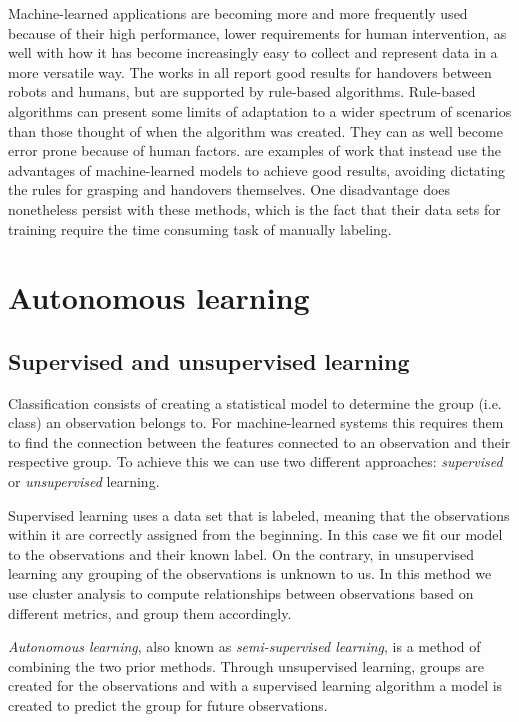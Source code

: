 Machine-learned applications are becoming more and more frequently used because of their high performance, lower requirements for human intervention, as well with how it has become increasingly easy to collect and represent data in a more versatile way. The works in \parencite{Aleotti2012} \parencite{Suay2015} \parencite{Kim2004} all report good results for handovers between robots and humans, but are supported by rule-based algorithms. Rule-based algorithms can present some limits of adaptation to a wider spectrum of scenarios than those thought of when the algorithm was created. They can as well become error prone because of human factors. \parencite{Redmon2014} \parencite{Lenz2015} \parencite{Jiang2011} \parencite{Huebner2008a} are examples of work that instead use the advantages of machine-learned models to achieve good results, avoiding dictating the rules for grasping and handovers themselves. One disadvantage does nonetheless persist with these methods, which is the fact that their data sets for training require the time consuming task of manually labeling.


\section{Autonomous learning}


\subsection{Supervised and unsupervised learning}

Classification consists of creating a statistical model to determine the group (i.e. class) an observation belongs to. For machine-learned systems this requires them to find the connection between the features connected to an observation and their respective group. To achieve this we can use two different approaches: \emph{supervised} or \emph{unsupervised} learning.

Supervised learning uses a data set that is labeled, meaning that the observations within it are correctly assigned from the beginning. In this case we fit our model to the observations and their known label. On the contrary, in unsupervised learning any grouping of the observations is unknown to us. In this method we use cluster analysis to compute relationships between observations based on different metrics, and group them accordingly.

\emph{Autonomous learning}, also known as \emph{semi-supervised learning}, is a method of combining the two prior methods. Through unsupervised learning, groups are created for the observations and with a supervised learning algorithm a model is created to predict the group for future observations.



